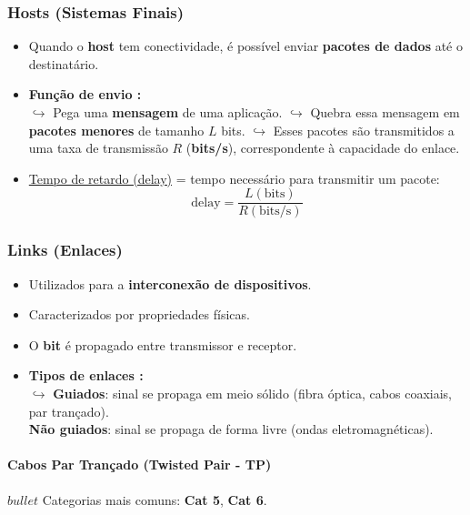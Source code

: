     \subsubsection*{Hosts (Sistemas Finais)}
    \begin{itemize}
        \item Quando o \textbf{host} tem conectividade, é possível enviar \textbf{pacotes de dados} até o destinatário.
        \item \textbf{Função de envio :} \\
            $\hookrightarrow$ Pega uma \textbf{mensagem} de uma aplicação.
            $\hookrightarrow$ Quebra essa mensagem em \textbf{pacotes menores} de tamanho $L$ bits.
            $\hookrightarrow$ Esses pacotes são transmitidos a uma taxa de transmissão $R$ (\textbf{bits/s}), correspondente à capacidade do enlace.
        \item \underline{Tempo de retardo (delay)} = tempo necessário para transmitir um pacote:  
        \[
        \text{delay} = \frac{L (\text{bits})}{R (\text{bits/s})}
        \]
    \end{itemize}

    \subsubsection*{Links (Enlaces)}
    \begin{itemize}
        \item Utilizados para a \textbf{interconexão de dispositivos}.
        \item Caracterizados por propriedades físicas.
        \item O \textbf{bit} é propagado entre transmissor e receptor.
        \item \textbf{Tipos de enlaces :} \\
            $\hookrightarrow$ \textbf{Guiados}: sinal se propaga em meio sólido (fibra óptica, cabos coaxiais, par trançado). \\
            \textbf{Não guiados}: sinal se propaga de forma livre (ondas eletromagnéticas). 
    \end{itemize}

    \paragraph{Cabos Par Trançado (Twisted Pair - TP)}
    
        $bullet$ Categorias mais comuns: \textbf{Cat 5}, \textbf{Cat 6}.
    
